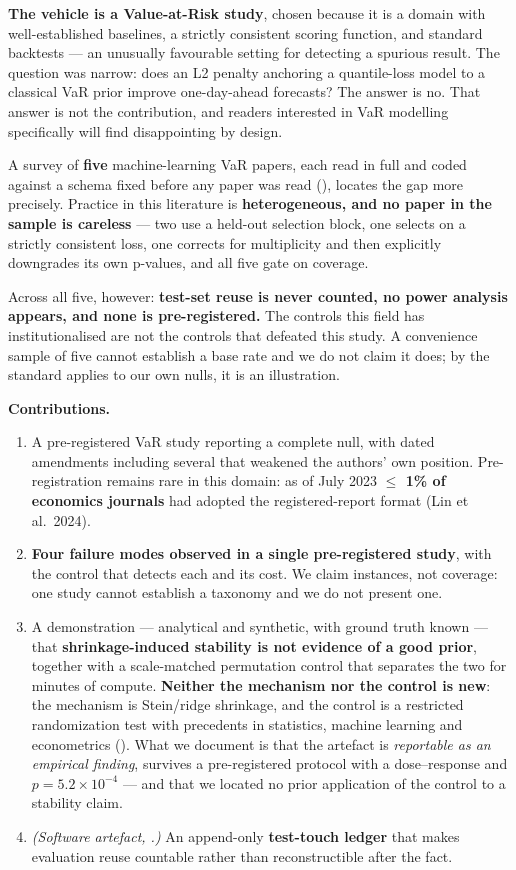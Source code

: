 \textbf{The vehicle is a Value-at-Risk study}, chosen because it is a domain with well-established
baselines, a strictly consistent scoring function, and standard backtests --- an unusually
favourable setting for detecting a spurious result. The question was narrow: does an L2 penalty
anchoring a quantile-loss model to a classical VaR prior improve one-day-ahead forecasts? The
answer is no. That answer is not the contribution, and readers interested in VaR modelling
specifically will find  disappointing by design.

A survey of \textbf{five} machine-learning VaR papers, each read in full and coded against a schema
fixed before any paper was read (), locates the gap more precisely. Practice in this
literature is \textbf{heterogeneous, and no paper in the sample is careless} --- two use a held-out
selection block, one selects on a strictly consistent loss, one corrects for multiplicity and
then explicitly downgrades its own p-values, and all five gate on coverage.

Across all five, however: \textbf{test-set reuse is never counted, no power analysis appears, and none
is pre-registered.} The controls this field has institutionalised are not the controls that
defeated this study. A convenience sample of five cannot establish a base rate and we do not
claim it does; by the standard  applies to our own nulls, it is an illustration.

\textbf{Contributions.}

\begin{enumerate}
\def\labelenumi{\arabic{enumi}.}
\tightlist
\item
  A pre-registered VaR study reporting a complete null, with dated amendments including
  several that weakened the authors' own position. Pre-registration remains rare in this
  domain: as of July 2023 \textbf{$\leq$ 1\% of economics journals} had adopted the registered-report
  format (Lin et al.~2024).
\item
  \textbf{Four failure modes observed in a single pre-registered study}, with the control that
  detects each and its cost. We claim instances, not coverage: one study cannot establish a
  taxonomy and we do not present one.
\item
  A demonstration --- analytical and synthetic, with ground truth known --- that
  \textbf{shrinkage-induced stability is not evidence of a good prior}, together with a
  scale-matched permutation control that separates the two for minutes of compute.
  \textbf{Neither the mechanism nor the control is new}: the mechanism is Stein/ridge shrinkage,
  and the control is a restricted randomization test with precedents in statistics, machine
  learning and econometrics (). What we document is that the artefact is \emph{reportable as an
  empirical finding}, survives a pre-registered protocol with a dose--response and
  \(p = 5.2 \times 10^{-4}\) --- and that we located no prior application of the control to a stability claim.
\item
  \emph{(Software artefact, .)} An append-only \textbf{test-touch ledger} that makes
  evaluation reuse countable rather than reconstructible after the fact.
\end{enumerate}
